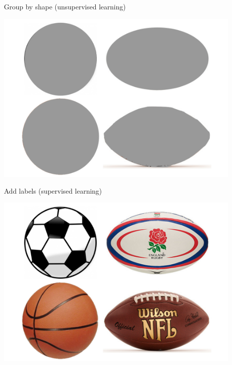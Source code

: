 \documentclass[pdf]{beamer}
\begin{document}
\begin{frame}{Group by shape (unsupervised learning)}
\begin{center}
	\includegraphics[width=0.9\textwidth]{flashcardHidden.png}
\end{center}
\end{frame}

\begin{frame}{Add labels (supervised learning)}
\begin{center}
	\includegraphics[width=0.9\textwidth]{flashcardExposed.png}
\end{center}
\end{frame}
\end{document}

